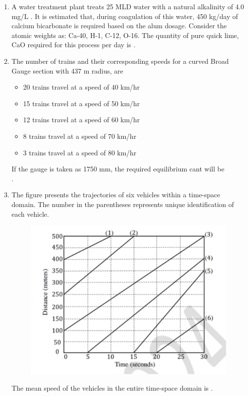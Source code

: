 \documentclass[journal,12pt,onecolumn]{article}
\theoremstyle{remark}
\begin{document}
\begin{enumerate}
    \item A water treatment plant treats 25 MLD water with a natural 
    alkalinity of 4.0 mg/L . It is estimated that,
    during coagulation of this water, 450 kg/day of calcium bicarbonate  is required based on the alum dosage.
    Consider the atomic weights as: Ca-40, H-1, C-12, O-16.
    The quantity of pure quick lime, CaO  required for this process per day is \underline{\hspace{2cm}} .
    
    \hfill{}
    
    \item The number of trains and their corresponding speeds for a curved Broad Gauge section with 437 m radius, are
    \begin{itemize}
        \item 20 trains travel at a speed of 40 km/hr
        \item 15 trains travel at a speed of 50 km/hr
        \item 12 trains travel at a speed of 60 km/hr
        \item 8 trains travel at a speed of 70 km/hr
        \item 3 trains travel at a speed of 80 km/hr
    \end{itemize}
    If the gauge  is taken as 1750 mm, the required equilibrium cant  will be \underline{\hspace{2cm}} \\
    .
    
    \hfill{}
    
    \item The figure  presents the trajectories of six vehicles within a time-space domain. The number in the parentheses represents unique identification of each vehicle.
    \begin{figure}[H]
        \centering
        \includegraphics[width=0.7\columnwidth]{figs/1Q63.jpg}
        \caption{}
        \label{fig:q63}
    \end{figure}
    The mean speed  of the vehicles in the entire time-space domain is \underline{\hspace{2cm}} .
    

\end{enumerate}
\end{document}
